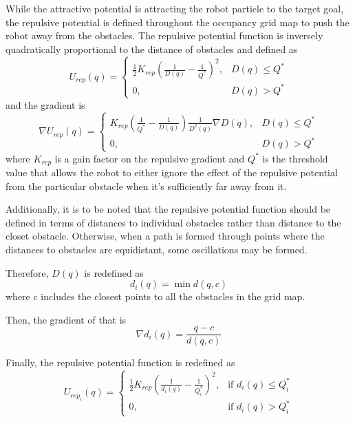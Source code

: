 \documentclass[11pt]{article} %
\begin{document}
While the attractive potential is attracting the robot particle to the target goal, the repulsive potential is defined throughout the occupancy grid map to push the robot away from the obstacles.  The repulsive potential function is inversely quadratically proportional to the distance of obstacles and defined as
\begin{equation}
	U_{rep}(q) = 
	\begin{cases}
		\frac{1}{2}K_{rep}(\frac{1}{D(q)}-\frac{1}{Q^*})^2, & D(q) \leq Q^{*} \\
		0, & D(q) > Q^{*}
	\end{cases}
\end{equation}
and the gradient is
\begin{equation}
	\nabla U_{rep}(q) = 
	\begin{cases}
		K_{rep}(\frac{1}{Q^*}-\frac{1}{D(q)})\frac{1}{D^2(q)}\nabla D(q), & D(q) \leq Q^{*} \\
		0, & D(q) > Q^{*}
	\end{cases}
\end{equation}
where $K_{rep}$ is a gain factor on the repulsive gradient and $Q^{*}$ is the threshold value that allows the robot to either ignore the effect of the repulsive potential from the particular obstacle when it's sufficiently far away from it.

Additionally, it is to be noted that the repulsive potential function should be defined in terms of distances to individual obstacles rather than distance to the closet obstacle.  Otherwise, when a path is formed through points where the distances to obstacles are equidistant, some oscillations may be formed.

Therefore, $D(q)$ is redefined as
\begin{equation}
	d_i(q) = \min d(q,c)
\end{equation}
where c includes the closest points to all the obstacles in the grid map.

Then, the gradient of that is
\begin{equation}
	\nabla d_i(q) = \frac{q-c}{d(q,c)}
\end{equation}

Finally, the repulsive potential function is redefined as
\begin{equation}
	U_{rep_{i}}(q) = 
	\begin{cases}
		\frac{1}{2}K_{rep}(\frac{1}{d_i(q)}-\frac{1}{Q_i^*})^2, & \mbox{if } d_i(q) \leq Q_i^* \\
		0 ,& \mbox{if } d_i(q) > Q_i^*
	\end{cases}
\end{equation}
\end{document}
